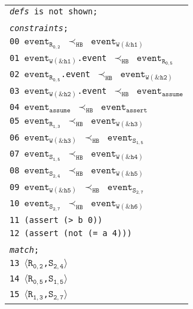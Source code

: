 \newsavebox{\boxSMTa}
\begin{lrbox}{\boxSMTa}
\normalsize
\begin{tabular}[c]{l}
\texttt{\textit{defs} is not shown;}\\
\\
\texttt{\textit{constraints};}\\
\texttt{00 $\mathtt{event_{R_{0,2}}}$ $\mathtt{\prec_\mathtt{HB}}$ $\mathtt{event_{W(\&h1)}}$}\\
\texttt{01 $\mathtt{event_{W(\&h1)}}$.event $\mathtt{\prec_\mathtt{HB}}$ $\mathtt{event_{R_{0,5}}}$}\\
\texttt{02 $\mathtt{event_{R_{0,5}}}$.event $\mathtt{\prec_\mathtt{HB}}$ $\mathtt{event_{W(\&h2)}}$}\\
\texttt{03 $\mathtt{event_{W(\&h2)}}$.event $\mathtt{\prec_\mathtt{HB}}$ $\mathtt{event_{assume}}$}\\
\texttt{04 $\mathtt{event_{assume}}$ $\mathtt{\prec_\mathtt{HB}}$ $\mathtt{event_{assert}}$}\\
\texttt{05 $\mathtt{event_{R_{1,3}}}$ $\mathtt{\prec_\mathtt{HB}}$ $\mathtt{event_{W(\&h3)}}$}\\
\texttt{06 $\mathtt{event_{W(\&h3)}}$ $\mathtt{\prec_\mathtt{HB}}$ $\mathtt{event_{S_{1,5}}}$}\\
\texttt{07 $\mathtt{event_{S_{1,5}}}$ $\mathtt{\prec_\mathtt{HB}}$ $\mathtt{event_{W(\&h4)}}$}\\
\texttt{08 $\mathtt{event_{S_{2,4}}}$ $\mathtt{\prec_\mathtt{HB}}$ $\mathtt{event_{W(\&h5)}}$}\\
\texttt{09 $\mathtt{event_{W(\&h5)}}$ $\mathtt{\prec_\mathtt{HB}}$ $\mathtt{event_{S_{2,7}}}$}\\
\texttt{10 $\mathtt{event_{S_{2,7}}}$ $\mathtt{\prec_\mathtt{HB}}$ $\mathtt{event_{W(\&h6)}}$}\\
\texttt{11 (assert (> b 0))}\\
\texttt{12 (assert (not (= a 4)))}\\
\\
\texttt{\textit{match};}\\
\texttt{13 $\langle\mathtt{R_{0,2}}$,$\mathtt{S_{2,4}}\rangle$}\\
\texttt{14 $\langle\mathtt{R_{0,5}}$,$\mathtt{S_{1,5}}\rangle$}\\
\texttt{15 $\langle\mathtt{R_{1,3}}$,$\mathtt{S_{2,7}}\rangle$}\\

\end{tabular}
\end{lrbox}

